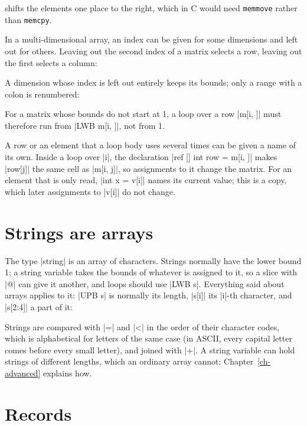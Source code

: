
\noindent shifts the elements one place to the right, which in C would
need \texttt{memmove} rather than \texttt{memcpy}.

In a multi-dimensional array, an index can be given for some dimensions
and left out for others. Leaving out the second index of a matrix selects
a row, leaving out the first selects a column:


A dimension whose index is left out entirely keeps its bounds; only a
range with a colon is renumbered:


\noindent For a matrix whose bounds do not start at 1, a loop over a row
\code|m[i, ]| must therefore run from \code|LWB m[i, ]|, not from 1.

A row or an element that a loop body uses several times can be given a
name of its own. Inside a loop over \code|i|, the declaration
\code|ref [] int row = m[i, ]| makes \code|row[j]| the same cell as
\code|m[i, j]|, so assignments to it change the matrix. For an element
that is only read, \code|int x = v[i]| names its current value; this is
a copy, which later assignments to \code|v[i]| do not change.

\section{Strings are arrays}\label{sec-strings}

The type \code|string| is an array of characters. Strings normally have
the lower bound 1; a string variable takes the bounds of whatever is
assigned to it, so a slice with \code|@| can give it another, and loops
should use \code|LWB s|. Everything said about arrays applies to it:
\code|UPB s| is normally its length,
\code|s[i]| its \code|i|-th character, and \code|s[2:4]| a part of it:


Strings are compared with \code|=| and \code|<| in the order of their
character codes, which is alphabetical for letters of the same case
(in ASCII, every capital letter comes before every small letter), and
joined with \code|+|. A string variable can hold strings of different
lengths, which an ordinary array cannot; Chapter~\ref{ch-advanced} explains how.

\section{Records}\label{sec-records}

